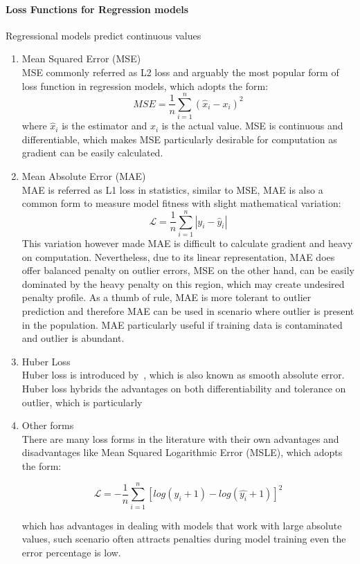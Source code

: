 \paragraph {Loss Functions for Regression models}
Regressional models predict continuous values
\begin{enumerate}
    \item Mean Squared Error (MSE) \\
MSE commonly referred as L2 loss and arguably the most popular form of loss function in regression models, which adopts the form:
\begin{equation}
    MSE = \frac{1}{n}\sum_{i=1}^n (\hat{x}_i - x_i)^2
\end{equation}
where $\hat{x}_i$ is the estimator and $x_i$ is the actual value. MSE is continuous and differentiable, which makes MSE particularly desirable for computation as gradient can be easily calculated. 
    \item Mean Absolute Error (MAE) \\
MAE is referred as L1 loss in statistics, similar to MSE, MAE is also a common form to measure model fitness with slight mathematical variation:
\begin{equation}
    \mathcal{L} = \frac {1}{n} \sum_{i=1}^n |y_i - \hat{y}_i|
\end{equation}
This variation however made MAE is difficult to calculate gradient and heavy on computation. Nevertheless, due to its linear representation, MAE does offer balanced penalty on outlier errors, MSE on the other hand, can be easily dominated by the heavy penalty on this region, which may create undesired penalty profile. As a thumb of rule, MAE is more tolerant to outlier prediction and therefore MAE can be used in scenario where outlier is present in the population. MAE particularly useful if training data is contaminated and outlier is abundant. 
    \item Huber Loss\\
Huber loss is introduced by~\citet{Huber_1964}, which is also known as smooth absolute error. Huber loss hybrids the advantages on both differentiability and tolerance on outlier, which is particularly 
    \item Other forms\\
There are many loss forms in the literature with their own advantages and disadvantages like Mean Squared Logarithmic Error (MSLE), which adopts the form:

\begin{equation}
    \mathcal{L} = -\frac{1}{n}\sum_{i=1}^n [log (y_i + 1) -  log(\hat{y_i} + 1) ]^2 
\end{equation}

which has advantages in dealing with models that work with large absolute values, such scenario often attracts penalties during model training even the error percentage is low. 
\end{enumerate}

